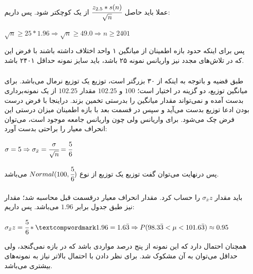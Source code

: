 \documentclass[12pt]{article}
\begin{document}
	\subsubsection*{ }
	عملا باید حاصل
	$
	\cfrac{z_{2.5}  * s(n)}{\sqrt{n}}
	$
	از یک کوچکتر شود. پس داریم:
	\begin{latin}
		$
		\sqrt{n} \geq 25 * 1.96 \Rightarrow \sqrt{n} \geq 49.0 \Rightarrow n \geq 2401
		$
	\end{latin}
	پس برای اینکه حدود بازه اطمینان از میانگین ۱ واحد اختلاف داشته باشند با فرض این که در تلاش‌های مجدد نیز واریانس نمونه ۲۵ باشد، باید سایز نمونه حداقل ۲۴۰۱ باشد.
	\subsubsection*{ }
	طبق قضیه
	و باتوجه به اینکه
	از ۳۰ بزرگتر است،
	توزیع
	یک توزیع نرمال می‌باشد. برای میانگین توزیع، دو گزینه در اختیار است؛ $100$ و $102.25$ مقدار $102.25$  از یک نمونه‌برداری بدست آمده و نمی‌تواند مقدار میانگین را بدرستی تخمین بزند. دراینجا با فرض درست بودن ادعا توزیع بدست می‌آید و سپس در قسمت بعد با بازه اطمینان میزان درستی این فرض چک می‌شود. برای واریانس ولی چون واریانس جامعه موجود است، می‌توان انحراف معیار
	را براحتی بدست آورد:
	\begin{latin}
		$
		\sigma = 5 \Rightarrow \sigma_{\bar{x}} = \cfrac{\sigma}{\sqrt{n}} = \cfrac{5}{6}
		$
	\end{latin}
	پس درنهایت می‌توان گفت توزیع
	یک توزیع از نوع
	$
	Normal(100, \cfrac{5}{6})
	$
	می‌باشد.
	\subsubsection*{ }
	باید مقدار
	$
	\sigma_{\bar{x}} z
	$
	را حساب کرد. مقدار انحراف معیار درقسمت قبل محاسبه شد؛ مقدار
	نیز طبق جدول برابر $1.96$ می‌باشد. پس داریم:
	\begin{latin}
		$
		\sigma_{\bar{x}} z = \cfrac{5}{6} *‌ 1.96 = 1.6\bar{3} \Rightarrow  P(98.3\bar{3} < \mu < 101.6\bar{3}) \approx 0.95
		$
	\end{latin}
	همچنان احتمال دارد که این نمونه از پنج درصد مواردی باشد که در بازه نمی‌گنجد، ولی حداقل می‌توان به آن مشکوک شد. برای نظر دادن با احتمال بالاتر نیاز به نمونه‌های بیشتری می‌باشد.
	
\end{document}
